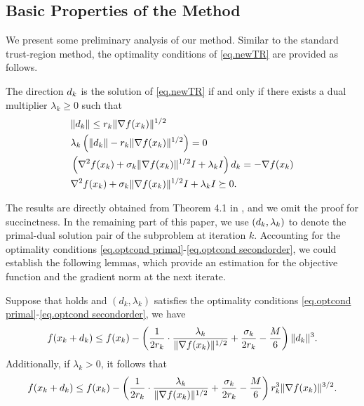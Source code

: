 \subsection{Basic Properties of the Method}
We present some preliminary analysis of our method. Similar to the standard trust-region method, the optimality conditions of \eqref{eq.newTR} are provided as follows.
\begin{lemma}\label{lem.optimal condition}
    The direction $d_k$ is the solution of \eqref{eq.newTR} if and only if there exists a dual multiplier $\lambda_k \geq 0 $ such that
    \begin{subequations}
        \begin{align}
            \label{eq.optcond primal}
             & \| d_k\| \leq r_k\|\nabla f(x_k)\|^{1/2}                                        \\
            \label{eq.optcond coml slack}
             & \lambda_k \left(\|d_k\|-r_k\|\nabla f(x_k)\|^{1/2} \right)=0                    \\
            \label{eq.optcond firstorder}
             & \left(\nabla ^2 f(x_k) + \sigma_k \|\nabla f(x_k)\|^{1/2} I + \lambda_k I \right) d_k = -\nabla f(x_k) \\
            \label{eq.optcond secondorder}
             & \nabla ^2 f(x_k) + \sigma_k \|\nabla f(x_k)\|^{1/2} I + \lambda_k I \succeq 0.
        \end{align}
    \end{subequations}
\end{lemma}
The results are directly obtained from Theorem 4.1 in \cite{nocedal1999numerical}, and we omit the proof for succinctness. In the remaining part of this paper, we use $(d_k,\lambda_k)$ to denote the primal-dual solution pair of the subproblem at iteration $k$. Accounting for the optimality conditions \eqref{eq.optcond primal}-\eqref{eq.optcond secondorder}, we could establish the following lemmas, which provide an estimation for the objective function and the gradient norm at the next iterate.
\begin{lemma}\label{lem.function decrease conceptual}
    Suppose that  holds and $(d_k, \lambda_k)$ satisfies the optimality conditions \eqref{eq.optcond primal}-\eqref{eq.optcond secondorder}, we have
    \begin{equation}
        \label{eq.functionvalue d}
        f(x_k+d_k) \leq f(x_k) - \left(\frac{1}{2r_k} \cdot \frac{\lambda_k}{\|\nabla f(x_k)\|^{1/2}} + \frac{\sigma_k}{2r_k} - \frac{M}{6}\right)\|d_k\|^3.
    \end{equation}
    Additionally, if $\lambda_k > 0$, it follows that
    \begin{equation}
        \label{eq.functionvalue g}
        f(x_k+d_k) \leq f(x_k) - \left(\frac{1}{2r_k} \cdot \frac{\lambda_k}{\|\nabla f(x_k)\|^{1/2}} + \frac{\sigma_k}{2r_k} - \frac{M}{6}\right)r_k^3\|\nabla f(x_k)\|^{3/2}.
    \end{equation}
\end{lemma}
